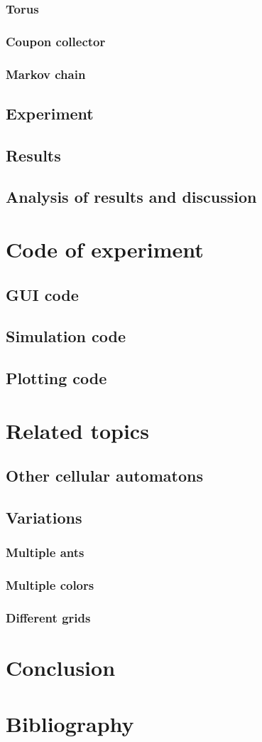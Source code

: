 \documentclass{article}
\begin{document}
\subsubsection{Torus}
\subsubsection{Coupon collector}
\subsubsection{Markov chain}
\subsection{Experiment}
\subsection{Results}
\subsection{Analysis of results and discussion}

\section{Code of experiment}
\subsection{GUI code}
\subsection{Simulation code}
\subsection{Plotting code}

\section{Related topics}
\subsection{Other cellular automatons}
\subsection{Variations}
\subsubsection{Multiple ants}
\subsubsection{Multiple colors}
\subsubsection{Different grids}


\section{Conclusion}


\section{Bibliography}
\end{document}
